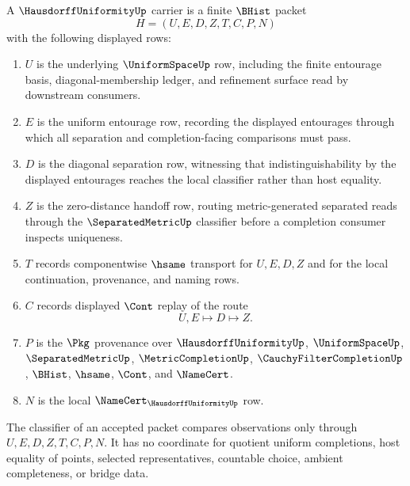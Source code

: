 \begin{definition}
\label{def:hausdorff-uniformity-carrier}
A $\HausdorffUniformityUp$ carrier is a finite $\BHist$ packet
$$
H=(U,E,D,Z,T,C,P,N)
$$
with the following displayed rows:
\begin{enumerate}
\item $U$ is the underlying $\UniformSpaceUp$ row, including the finite entourage basis, diagonal-membership ledger, and refinement surface read by downstream consumers.
\item $E$ is the uniform entourage row, recording the displayed entourages through which all separation and completion-facing comparisons must pass.
\item $D$ is the diagonal separation row, witnessing that indistinguishability by the displayed entourages reaches the local classifier rather than host equality.
\item $Z$ is the zero-distance handoff row, routing metric-generated separated reads through the $\SeparatedMetricUp$ classifier before a completion consumer inspects uniqueness.
\item $T$ records componentwise $\hsame$ transport for $U,E,D,Z$ and for the local continuation, provenance, and naming rows.
\item $C$ records displayed $\Cont$ replay of the route
$$
U,E\longmapsto D\longmapsto Z .
$$
\item $P$ is the $\Pkg$ provenance over $\HausdorffUniformityUp$, $\UniformSpaceUp$, $\SeparatedMetricUp$, $\MetricCompletionUp$, $\CauchyFilterCompletionUp$, $\BHist$, $\hsame$, $\Cont$, and $\NameCert$.
\item $N$ is the local $\NameCert_{\HausdorffUniformityUp}$ row.
\end{enumerate}
The classifier of an accepted packet compares observations only through $U,E,D,Z,T,C,P,N$. It has no coordinate for quotient uniform completions, host equality of points, selected representatives, countable choice, ambient completeness, or bridge data.
\end{definition}

